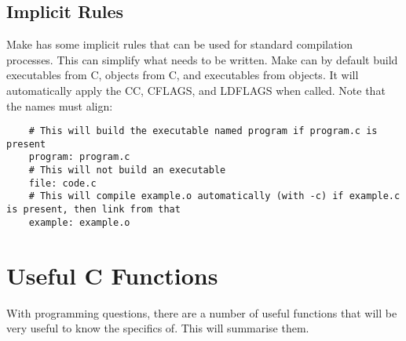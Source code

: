 \documentclass{article}
\begin{document}
\subsection{Implicit Rules}
Make has some implicit rules that can be used for standard compilation processes. This can simplify what needs to be written. Make can by default build executables from C, objects from C, and executables from objects. It will automatically apply the CC, CFLAGS, and LDFLAGS when called. Note that the names must align:
\begin{verbatim}
    # This will build the executable named program if program.c is present
    program: program.c
    # This will not build an executable
    file: code.c
    # This will compile example.o automatically (with -c) if example.c is present, then link from that
    example: example.o
\end{verbatim}


\newpage
\section{Useful C Functions}
With programming questions, there are a number of useful functions that will be very useful to know the specifics of. This will summarise them.
\end{document}

